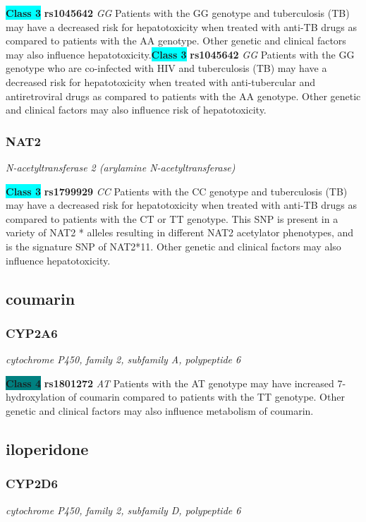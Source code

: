 \documentclass{report}
\begin{document}
\textbf{\colorbox{cyan} {Class 3}} \textbf{ rs1045642 } \textit{ GG }
Patients with the GG genotype and tuberculosis (TB) may have a decreased risk for hepatotoxicity when treated with anti-TB drugs as compared to patients with the AA genotype. Other genetic and clinical factors may also influence hepatotoxicity.\newline\textbf{\colorbox{cyan} {Class 3}} \textbf{ rs1045642 } \textit{ GG }
Patients with the GG genotype who are co-infected with HIV and tuberculosis (TB) may have a decreased risk for hepatotoxicity when treated with anti-tubercular and antiretroviral drugs as compared to patients with the AA genotype. Other genetic and clinical factors may also influence risk of hepatotoxicity.\newline\subsubsection{ NAT2 }
\textit{ N-acetyltransferase 2 (arylamine N-acetyltransferase) }

\textbf{\colorbox{cyan} {Class 3}} \textbf{ rs1799929 } \textit{ CC }
Patients with the CC genotype and tuberculosis (TB) may have a decreased risk for hepatotoxicity when treated with anti-TB drugs as compared to patients with the CT or TT genotype. This SNP is present in a variety of NAT2 * alleles resulting in different NAT2 acetylator phenotypes, and is the signature SNP of NAT2*11. Other genetic and clinical factors may also influence hepatotoxicity.\newline\subsection{ coumarin }\subsubsection{ CYP2A6 }
\textit{ cytochrome P450, family 2, subfamily A, polypeptide 6 }

\textbf{\colorbox{teal} {Class 4}} \textbf{ rs1801272 } \textit{ AT }
Patients with the AT genotype may have increased 7-hydroxylation of coumarin compared to patients with the TT genotype. Other genetic and clinical factors may also influence metabolism of coumarin.\newline\subsection{ iloperidone }\subsubsection{ CYP2D6 }
\textit{ cytochrome P450, family 2, subfamily D, polypeptide 6 }
\end{document}
